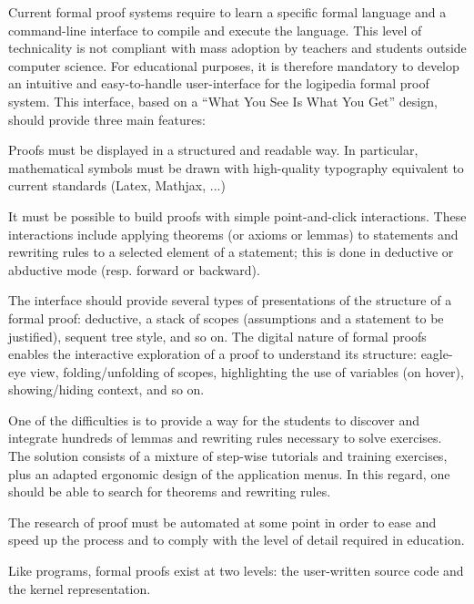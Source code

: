 Current formal proof systems require to learn a specific formal
language and a command-line interface to compile and execute the
language. This level of technicality is not compliant with mass adoption
by teachers and students outside computer science. For educational
purposes, it is therefore mandatory to develop an intuitive and
easy-to-handle user-interface for the logipedia formal proof
system. This interface, based on a ``What You See Is What You Get''
design, should provide three main features:
\begin{compactitem}
\item Proofs must be displayed in a structured and readable way. In
  particular, mathematical symbols must be drawn with high-quality
  typography equivalent to current standards (Latex, Mathjax, ...)
\item It must be possible to build proofs with simple point-and-click
  interactions. These interactions include applying theorems (or
  axioms or lemmas) to statements and rewriting rules to a selected
  element of a statement; this is done in deductive or abductive mode
  (resp. forward or backward).
\item The interface should provide several types of presentations of
  the structure of a formal proof: deductive, a stack of scopes
  (assumptions and a statement to be justified), sequent tree style,
  and so on. The digital nature of formal proofs enables the
  interactive exploration of a proof to understand its structure:
  eagle-eye view, folding/unfolding of scopes, highlighting the use of
  variables (on hover), showing/hiding context, and so on.
\end{compactitem}

One of the difficulties is to provide a way for the students to discover
and integrate hundreds of lemmas and rewriting rules necessary to solve
exercises. The solution consists of a mixture of step-wise tutorials and
training exercises, plus an adapted ergonomic design of the application menus.
In this regard, one should be able to search for theorems and rewriting rules.

The research of proof must be automated at some point in order to ease and
speed up the process and to comply with the level of detail required in education.


Like programs, formal proofs exist at two levels: the user-written
source code and the kernel representation.

